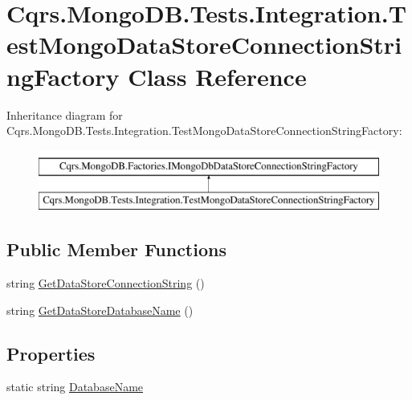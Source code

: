 \hypertarget{classCqrs_1_1MongoDB_1_1Tests_1_1Integration_1_1TestMongoDataStoreConnectionStringFactory}{}\section{Cqrs.\+Mongo\+D\+B.\+Tests.\+Integration.\+Test\+Mongo\+Data\+Store\+Connection\+String\+Factory Class Reference}
\label{classCqrs_1_1MongoDB_1_1Tests_1_1Integration_1_1TestMongoDataStoreConnectionStringFactory}
Inheritance diagram for Cqrs.\+Mongo\+D\+B.\+Tests.\+Integration.\+Test\+Mongo\+Data\+Store\+Connection\+String\+Factory\+:\begin{figure}[H]
\begin{center}
\leavevmode
\includegraphics[height=2.000000cm]{classCqrs_1_1MongoDB_1_1Tests_1_1Integration_1_1TestMongoDataStoreConnectionStringFactory}
\end{center}
\end{figure}
\subsection*{Public Member Functions}
\begin{DoxyCompactItemize}
\item 
string \hyperlink{classCqrs_1_1MongoDB_1_1Tests_1_1Integration_1_1TestMongoDataStoreConnectionStringFactory_a520a0722aa91ed6144e4e86213ea13da}{Get\+Data\+Store\+Connection\+String} ()
\item 
string \hyperlink{classCqrs_1_1MongoDB_1_1Tests_1_1Integration_1_1TestMongoDataStoreConnectionStringFactory_a1f362a8cdae3f0fb7b8a51f62f7611f3}{Get\+Data\+Store\+Database\+Name} ()
\end{DoxyCompactItemize}
\subsection*{Properties}
\begin{DoxyCompactItemize}
\item 
static string \hyperlink{classCqrs_1_1MongoDB_1_1Tests_1_1Integration_1_1TestMongoDataStoreConnectionStringFactory_a2d26a00fd14aad6718b48d515ac30ff9}{Database\+Name}
\end{DoxyCompactItemize}



